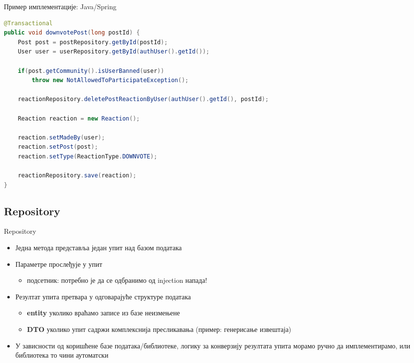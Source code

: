 \documentclass{beamer}
\begin{document}
    \begin{frame}[fragile]{Пример имплементације: Java/Spring}
        \begin{adjustbox}{width=\textwidth,height=\textheight,keepaspectratio}
            \begin{lstlisting}[language=java]
@Transactional
public void downvotePost(long postId) {
    Post post = postRepository.getById(postId);
    User user = userRepository.getById(authUser().getId());

    if(post.getCommunity().isUserBanned(user))
        throw new NotAllowedToParticipateException();

    reactionRepository.deletePostReactionByUser(authUser().getId(), postId);

    Reaction reaction = new Reaction();

    reaction.setMadeBy(user);
    reaction.setPost(post);
    reaction.setType(ReactionType.DOWNVOTE);

    reactionRepository.save(reaction);
}
            \end{lstlisting}
        \end{adjustbox}
    \end{frame}
    
    \subsection{Repository}
    
    \begin{frame}{Repository}
        \begin{itemize}
            \item Једна метода представља један упит над базом података
            \item Параметре прослеђује у упит
            \begin{itemize}
                \item подсетник: потребно је да се одбранимо од injection напада!
            \end{itemize}
            \item Резултат упита претвара у одговарајуће структуре података
            \begin{itemize}
                \item \textbf{entity} уколико враћамо записе из базе неизмењене
                \item \textbf{DTO} уколико упит садржи комплекснија пресликавања (пример: генерисање извештаја)
            \end{itemize}
            \item У зависности од коришћене базе података/библиотеке, логику за конверзију резултата упита морамо ручно да имплементирамо, или библиотека то чини аутоматски
        \end{itemize}
    \end{frame}
    
\end{document}
